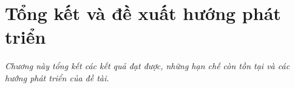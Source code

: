 \chapter{Tổng kết và đề xuất hướng phát triển}
\label{chapter:tongket}

\textit{Chương này tổng kết các kết quả đạt được, những hạn chế còn tồn tại và các hướng phát triển của đề tài.}




